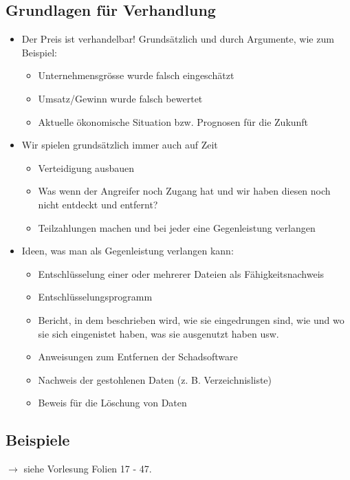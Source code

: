\subsection{Grundlagen für Verhandlung}
\begin{itemize}
    \item Der Preis ist verhandelbar! Grundsätzlich und durch Argumente, wie zum Beispiel:
    \begin{itemize}
        \item Unternehmensgrösse wurde falsch eingeschätzt
        \item Umsatz/Gewinn wurde falsch bewertet
        \item Aktuelle ökonomische Situation bzw. Prognosen für die Zukunft
    \end{itemize}
    \item Wir spielen grundsätzlich immer auch auf Zeit
    \begin{itemize}
        \item Verteidigung ausbauen
        \item Was wenn der Angreifer noch Zugang hat und wir haben diesen noch nicht entdeckt und entfernt?
        \item Teilzahlungen machen und bei jeder eine Gegenleistung verlangen
    \end{itemize}
    \item Ideen, was man als Gegenleistung verlangen kann:
    \begin{itemize}
        \item Entschlüsselung einer oder mehrerer Dateien als Fähigkeitsnachweis
        \item Entschlüsselungsprogramm
        \item Bericht, in dem beschrieben wird, wie sie eingedrungen sind, wie und wo sie sich eingenistet haben, was sie ausgenutzt haben usw.
        \item Anweisungen zum Entfernen der Schadsoftware
        \item Nachweis der gestohlenen Daten (z. B. Verzeichnisliste)
        \item Beweis für die Löschung von Daten
    \end{itemize}
\end{itemize}

\subsection{Beispiele}
$\rightarrow$ siehe Vorlesung Folien 17 - 47.